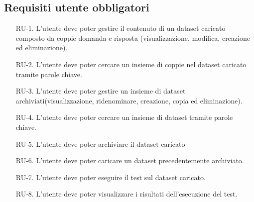 \subsection{Requisiti utente obbligatori}
\begin{enumerate}

    \label{item:RU-1}
    \item[RU-1.] L'utente deve poter gestire il contenuto di un dataset caricato composto da coppie domanda e risposta (visualizzazione,
     modifica, creazione ed eliminazione).
    
    \label{item:RU-2}
    \item[RU-2.] L'utente deve poter cercare un insieme di coppie nel dataset caricato tramite parole chiave.
    
    \label{item:RU-3}
    \item[RU-3.] L'utente deve poter gestire un insieme di dataset archiviati(visualizzazione, ridenominare, creazione, copia ed eliminazione).
    
    \label{item:RU-4}
    \item[RU-4.] L'utente deve poter cercare un insieme di dataset tramite parole chiave.
    
    \label{item:RU-5}
    \item[RU-5.] L'utente deve poter archiviare il dataset caricato
    
    \label{item:RU-6}
    \item[RU-6.] L'utente deve poter caricare un dataset precedentemente archiviato.
    
    \label{item:RU-7}
    \item[RU-7.] L'utente deve poter eseguire il test sul dataset caricato.
    
    \label{item:RU-8}
    \item[RU-8.] L'utente deve poter visualizzare i risultati dell'esecuzione del test.
\end{enumerate}

